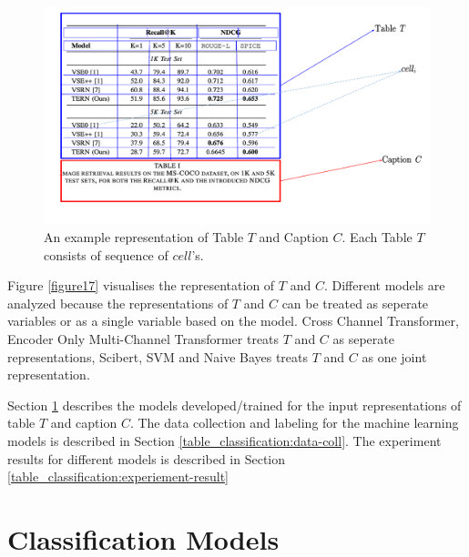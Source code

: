 \begin{figure}[h]
    \centering
    \includegraphics[width=\maxwidth{\textwidth}]{src/images/table-structure.pdf}
    \caption{An example representation of Table $T$ and Caption $C$. Each Table $T$ consists of sequence of $cell$'s. }
    \label{figure\arabic{figurecounter}}
\end{figure}

Figure \ref{figure17} visualises the representation of $T$ and $C$. Different models are analyzed because the representations of $T$ and $C$ can be treated as seperate variables or as a single variable based on the model. Cross Channel Transformer, Encoder Only Multi-Channel Transformer treats $T$ and $C$ as seperate representations, Scibert, SVM and Naive Bayes treats $T$ and $C$ as one joint representation. 


Section \ref{table_classification:models} describes the models developed/trained for the input representations of table $T$ and caption $C$. The data collection and labeling for the machine learning models is described in Section \ref{table_classification:data-coll}. The experiment results for different models is described in Section \ref{table_classification:experiement-result}

\section{Classification Models}
\label{table_classification:models}

